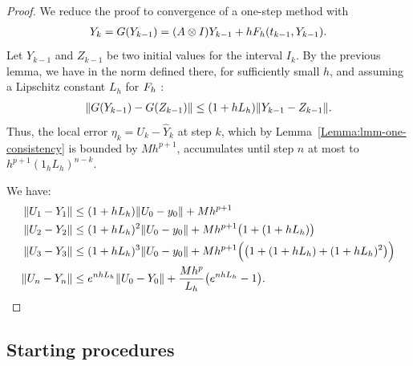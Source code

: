 \begin{proof}
  We reduce the proof to convergence of a one-step method with
  \begin{gather}
    \label{eq:lmm:18}
    Y_k = G(Y_{k-1}) =  (A\otimes I) Y_{k-1} + h F_h(t_{k-1}, Y_{k-1}).
  \end{gather}
  Let $Y_{k-1}$ and $Z_{k-1}$ be two initial values for the interval $I_k$.
  By the previous lemma, we have in the norm defined there, for
  sufficiently small $h$, and assuming a Lipschitz constant $L_h$ for
  $F_h$ :
  \begin{gather}
    \label{eq:lmm:19}
    \lVert G(Y_{k-1})-G(Z_{k-1})\rVert \le (1+h L_h) \lVert Y_{k-1}-Z_{k-1}\rVert.
  \end{gather}
  Thus, the local error $\eta_k = U_k - \widehat Y_k$ at step $k$, which by
  Lemma~\ref{Lemma:lmm-one-consistency} is bounded by $M h^{p+1}$, accumulates
  until step $n$ at most to $h^{p+1}(1_h L_h)^{n-k}$.

  We have:
  \begin{align*}
    \lVert U_1 - Y_1\rVert &\le (1+h L_h)\lVert U_0-y_0\rVert + M h^{p+1} \\
    \lVert U_2 - Y_2\rVert &\le (1+h L_h)^2\lVert U_0-y_0\rVert +  M h^{p+1} \bigl(1+ (1+h L_h)\bigr)\\
    \lVert U_3 - Y_3\rVert &\le (1+h L_h)^3\lVert U_0-y_0\rVert +  M h^{p+1} \Bigl(\bigl(1+ (1+h L_h)+ (1+h L_h)^2\bigr)\Bigr)\\
    \lVert U_n-Y_n\rVert &\le e^{n h L_h}\lVert U_0-Y_0\rVert +
    \frac{M h^p}{L_h}\bigl(e^{n h L_h} - 1\bigr).
  \end{align*}
\end{proof}

\subsection{Starting procedures}

